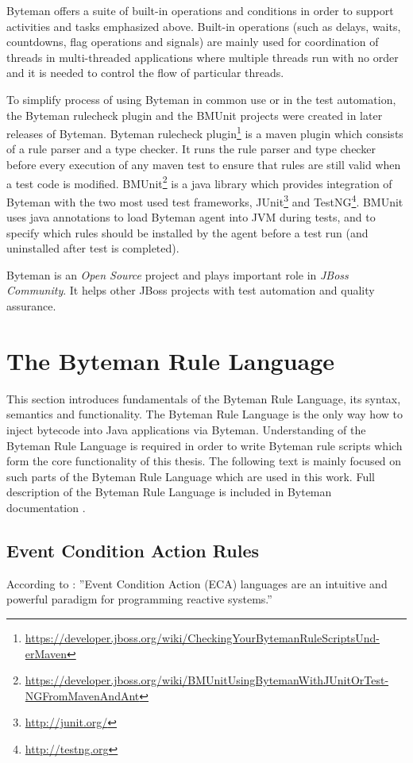\documentclass[12pt,oneside]{fithesis2}
\begin{document}
Byteman offers a suite of built-in operations and conditions in order to support activities and tasks emphasized above. Built-in operations (such as delays, waits, countdowns, flag operations and signals) are mainly used for coordination of threads in multi-threaded applications where multiple threads run with no order and it is needed to control the flow of particular threads.

To simplify process of using Byteman in common use or in the test automation, the Byteman rulecheck plugin and the BMUnit projects were created in later releases of Byteman. Byteman rulecheck plugin\footnote{\url{https://developer.jboss.org/wiki/CheckingYourBytemanRuleScriptsUnd-erMaven}} is a maven plugin which consists of a rule parser and a type checker. It runs the rule parser and type checker before every execution of any maven test to ensure that rules are still valid when a test code is modified. BMUnit\footnote{\url{https://developer.jboss.org/wiki/BMUnitUsingBytemanWithJUnitOrTest-NGFromMavenAndAnt}} is a java library which provides integration of Byteman with the two most used test frameworks, JUnit\footnote{\url{http://junit.org/}} and TestNG\footnote{\url{http://testng.org}}. BMUnit uses java annotations to load Byteman agent into JVM during tests, and to specify which rules should be installed by the agent before a test run (and uninstalled after test is completed).

Byteman is an \textit{Open Source} project and plays important role in \textit{JBoss Community}. It helps other JBoss projects with test automation and quality assurance.

\section{The Byteman Rule Language}
\label{byteman_rule_language}
This section introduces fundamentals of the Byteman Rule Language, its syntax, semantics and functionality. The Byteman Rule Language is the only way how to inject bytecode into Java applications via Byteman. Understanding of the Byteman Rule Language is required in order to write Byteman rule scripts which form the core functionality of this thesis. The following text is mainly focused on such parts of the Byteman Rule Language which are used in this work. Full description of the Byteman Rule Language is included in Byteman documentation \cite[The Byteman Rule Language]{byteman_doc}.

\subsection{Event Condition Action Rules}
\label{subsec:eca_sec}
According to \cite{eca}: ''Event Condition Action (ECA) languages are an intuitive and powerful paradigm for programming reactive systems.'' 
\end{document}
